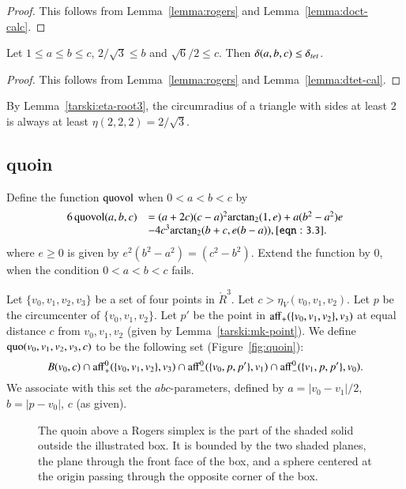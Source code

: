 \begin{proof} This follows from Lemma~\ref{lemma:rogers} and
Lemma~\ref{lemma:doct-calc}.
\end{proof}

\begin{lemma}
Let $1\le a \le b \le c$, $2/\sqrt{3}\le b$ and $\sqrt6/2\le c$.
Then $\delta(a,b,c) \le  \delta_{tet}$.
\end{lemma}

\begin{proof}  This follows from Lemma~\ref{lemma:rogers} and
Lemma~\ref{lemma:dtet-cal}.
\end{proof}

By Lemma~\ref{tarski:eta-root3}, the circumradius of a triangle
with sides at least $2$ is always at least $\eta(2,2,2)=2/\sqrt3$.



\subsection{quoin}

Define the function ${\operatorname{quovol}}$ when $0<a<b<c$ by
    \begin{equation}
    \begin{array}{lll}
    6\,\op{quovol}(a,b,c) &= (a+2c)  %
    (c-a)^2\atn(1,e)
        +a(b^2-a^2)e\\&-4c^3\atn(b+c,e(b-a)),
    \tlabel{eqn:3.3}
    \end{array}
    \end{equation}
where $e\ge0$ is given by $e^2(b^2-a^2)=(c^2-b^2)$.
Extend the function by $0$, when the condition $0<a<b<c$ fails.


\begin{definition}\label{def:quoin}
Let $\{v_0,v_1,v_2,v_3\}$ be a set of four points in $\ring{R}^3$.
Let $c>  \eta_V(v_0,v_1,v_2)$.  Let $p$ be the circumcenter
of $\{v_0,v_1,v_2\}$.  Let $p'$ be the point 
in ${\operatorname{aff}}_+(\{v_0,v_1,v_2\},v_3)$ at equal distance $c$
from $v_0,v_1,v_2$ (given by Lemma~\ref{tarski:mk-point}).
We define
${\operatorname{quo}}(v_0,v_1,v_2,v_3,c)$ to be the following set 
(Figure~\ref{fig:quoin}):
   $$
   B(v_0,c) \cap {\operatorname{aff}}_+^0(\{v_0,v_1,v_2\},v_3)
   \cap {\operatorname{aff}}_-^0(\{v_0,p,p'\},v_1) \cap
   {\operatorname{aff}}_-^0(\{v_1,p,p'\},v_0).
   $$
We associate with this set the $abc$-parameters, defined
by $a = |v_0-v_1|/2$, $b=|p-v_0|$, $c$ (as given).
\end{definition}

\begin{figure}[htb]
  \centering
  \caption{The quoin above a Rogers simplex is the part of the
  shaded solid outside
   the illustrated box.  It is bounded by the two
  shaded planes, the plane through
   the front face of the box, and a sphere
   centered at the origin passing through the opposite corner of the box.}
\end{figure}



